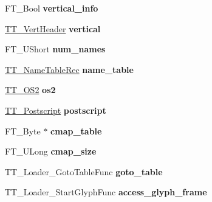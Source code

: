 \begin{DoxyCompactItemize}
\item 
\mbox{\label{struct_t_t___face_rec___a43e1c7d3fd3f43ddd7b1bba243bf10bc}} 
F\+T\+\_\+\+Bool {\bfseries vertical\+\_\+info}
\item 
\mbox{\label{struct_t_t___face_rec___a04fc41d3860163177a7e0a9bcf71ccf4}} 
\hyperlink{struct_t_t___vert_header__}{T\+T\+\_\+\+Vert\+Header} {\bfseries vertical}
\item 
\mbox{\label{struct_t_t___face_rec___ae73033d211e0ac91396e6bb22d594fab}} 
F\+T\+\_\+\+U\+Short {\bfseries num\+\_\+names}
\item 
\mbox{\label{struct_t_t___face_rec___a33d114b43e6646893f15d39065b77e8c}} 
\hyperlink{struct_t_t___name_table_rec__}{T\+T\+\_\+\+Name\+Table\+Rec} {\bfseries name\+\_\+table}
\item 
\mbox{\label{struct_t_t___face_rec___a5371adcbd62ade9b74e5f24a03ef09f2}} 
\hyperlink{struct_t_t___o_s2__}{T\+T\+\_\+\+O\+S2} {\bfseries os2}
\item 
\mbox{\label{struct_t_t___face_rec___a598bb9ada92970931585dc51878cf2cd}} 
\hyperlink{struct_t_t___postscript__}{T\+T\+\_\+\+Postscript} {\bfseries postscript}
\item 
\mbox{\label{struct_t_t___face_rec___a07bfd99f7725a1fb5f27b44a126a46ba}} 
F\+T\+\_\+\+Byte $\ast$ {\bfseries cmap\+\_\+table}
\item 
\mbox{\label{struct_t_t___face_rec___a4d2e127541e4f223c0b6c5d5aca4c8c5}} 
F\+T\+\_\+\+U\+Long {\bfseries cmap\+\_\+size}
\item 
\mbox{\label{struct_t_t___face_rec___a3e2e3599abb7737179dbb2fbbd15355d}} 
T\+T\+\_\+\+Loader\+\_\+\+Goto\+Table\+Func {\bfseries goto\+\_\+table}
\item 
\mbox{\label{struct_t_t___face_rec___a67cce5f4da277e6c8a47d8efe95bc58c}} 
T\+T\+\_\+\+Loader\+\_\+\+Start\+Glyph\+Func {\bfseries access\+\_\+glyph\+\_\+frame}

\end{DoxyCompactItemize}
